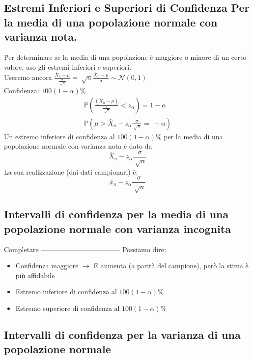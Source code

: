 \subsection[Estremi Inferiori e Superiori di Confidenza]{Estremi Inferiori e Superiori di Confidenza Per la media di una popolazione normale con varianza nota.}
Per determinare se la media di una popolazione è maggiore o minore di un certo
valore, uso gli estremi inferiori e superiori.
\\ Useremo ancora $\frac{\bar{X}_n - \mu}{\frac{\sigma}{\sqrt[]{n}}} = 
\sqrt[]{n} \frac{\bar{X}_n - \mu}{\sigma} \sim \mathcal{N}(0,1)$ 
\\ Confidenza: $100(1-\alpha) \%$
\begin{gather*}
    \mathbb{P}(\frac{(\bar{X}_n - \mu)}{\frac{\sigma}{\sqrt[]{n}}} < z_\alpha) 
    = 1 - \alpha \\
    \mathbb{P}(\mu > \bar{X}_n - z_\alpha \frac{\sigma}{\sqrt[]{n}} = \ - \alpha)
\end{gather*}
Un estremo inferiore di confidenza al $100(1-\alpha)\%$ per la media di una
popolazione normale con varianza nota è dato da
\begin{equation*}
    \bar{X}_n - z_\alpha \frac{\sigma}{\sqrt[]{n}}
\end{equation*}
La sua realizzazione (dai dati campionari) è:
\begin{equation*}
    \bar{x}_n - z_\alpha\frac{\sigma}{\sqrt[]{n}}
\end{equation*}
\subsection*{Intervalli di confidenza per la media di una popolazione normale con varianza incognita}
Completare -----------------------------------
Possiamo dire:
\begin{itemize}
    \item Confidenza maggiore $\rightarrow$ E aumenta (a parità del campione), però la
    stima è più affidabile
    \item Estremo inferiore di confidenza al $100(1-\alpha) \%$
    \item Estremo superiore di confidenza al $100(1-\alpha) \%$
\end{itemize}
\subsection*{Intervalli di confidenza per la varianza di una popolazione normale}

